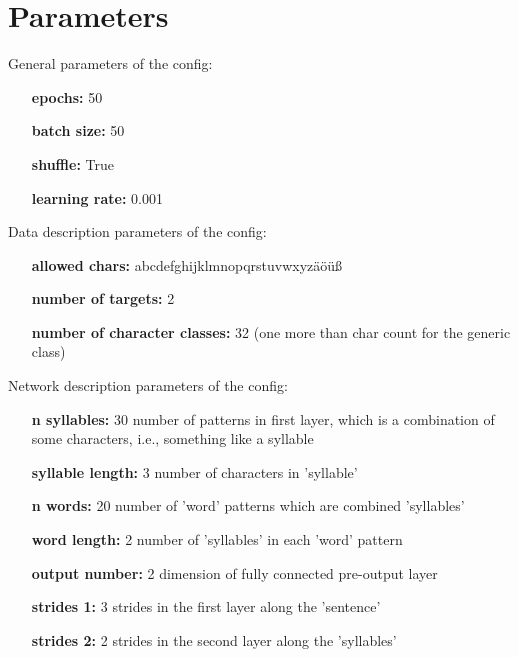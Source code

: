 \documentclass[a4paper,10pt,twoside]{article}
\begin{document}
 
\section{Parameters}

        General parameters of the config:
        

        \begin{itemize}
        \item[{\bf epochs:}] 50
        \item[{\bf batch size:}] 50
        \item[{\bf shuffle:}] True
        \item[{\bf learning rate:}] 0.001
        \end{itemize}
        

        
        Data description parameters of the config:
        

        \begin{itemize}
        \item[{\bf allowed chars:}] abcdefghijklmnopqrstuvwxyzäöüß 
        \item[{\bf number of targets:}] 2
        \item[{\bf number of character classes:}] 32 (one more than char count for the generic class)
        \end{itemize}
        

        
        Network description parameters of the config:
        

        \begin{itemize}
        \item[{\bf n syllables:}] 30 number of patterns in first layer, which is a combination of some characters, i.e., something like a syllable
        \item[{\bf syllable length:}] 3 number of characters in 'syllable'
        \item[{\bf n words:}] 20 number of 'word' patterns which are combined 'syllables'
        \item[{\bf word length:}] 2 number of 'syllables' in each 'word' pattern
        \item[{\bf output number:}] 2 dimension of fully connected pre-output layer
        \item[{\bf strides 1:}] 3 strides in the first layer along the 'sentence'
        \item[{\bf strides 2:}] 2 strides in the second layer along the 'syllables'
        \end{itemize}
        
\end{document}
